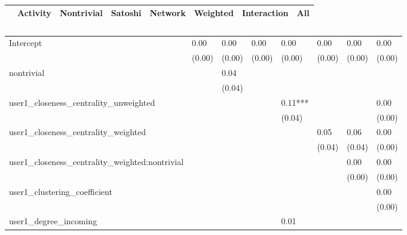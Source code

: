\begin{table}
\caption{}
\begin{center}
\begin{tabular}{lccccccc}
\hline
                                               & Activity & Nontrivial & Satoshi & Network & Weighted & Interaction &  All    \\
\hline
\hline
\end{tabular}
\begin{tabular}{llllllll}
Intercept                                      & 0.00     & 0.00       & 0.00    & 0.00    & 0.00     & 0.00        & 0.00    \\
                                               & (0.00)   & (0.00)     & (0.00)  & (0.00)  & (0.00)   & (0.00)      & (0.00)  \\
nontrivial                                     &          & 0.04       &         &         &          &             &         \\
                                               &          & (0.04)     &         &         &          &             &         \\
user1_closeness_centrality_unweighted          &          &            &         & 0.11*** &          &             & 0.00    \\
                                               &          &            &         & (0.04)  &          &             & (0.00)  \\
user1_closeness_centrality_weighted            &          &            &         &         & 0.05     & 0.06        & 0.00    \\
                                               &          &            &         &         & (0.04)   & (0.04)      & (0.00)  \\
user1_closeness_centrality_weighted:nontrivial &          &            &         &         &          & 0.00        & 0.00    \\
                                               &          &            &         &         &          & (0.00)      & (0.00)  \\
user1_clustering_coefficient                   &          &            &         &         &          &             & 0.00    \\
                                               &          &            &         &         &          &             & (0.00)  \\
user1_degree_incoming                          &          &            &         & 0.01    &          &             &         \\

\end{tabular}
\end{center}
\end{table}
